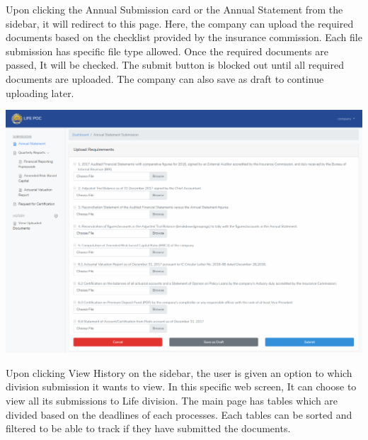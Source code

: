 \documentclass{article}
\begin{document}
\mdhr{}%

\noindent{}Upon clicking the Annual Submission card or the Annual
Statement from the sidebar, it will redirect to this page. Here, the
company can upload the required documents based on the checklist
provided by the insurance commission. Each file submission has specific
file type allowed. Once the required documents are passed, It will be
checked. The submit button is blocked out until all required documents
are uploaded. The company can also save as draft to continue uploading
later.%

\includegraphics[keepaspectratio=true]{up-ic-screens/image64}{}%

\mdhr{}%

\noindent{}Upon clicking View History on the sidebar, the user is
given an option to which division submission it wants to view. In this
specific web screen, It can choose to view all its submissions to Life
division. The main page has tables which are divided based on the
deadlines of each processes. Each tables can be sorted and filtered to
be able to track if they have submitted the documents.%
\end{document}
